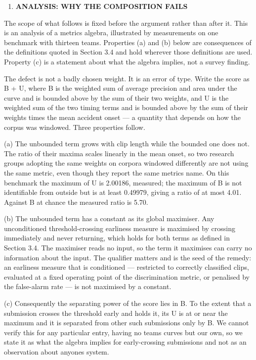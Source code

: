 \begin{enumerate}
\def\labelenumi{\arabic{enumi}.}
\setcounter{enumi}{4}
\item
  \textbf{ANALYSIS: WHY THE COMPOSITION FAILS}
\end{enumerate}

The scope of what follows is fixed before the argument rather than after it. This is an analysis of a metric\textquotesingle s algebra, illustrated by measurements on one benchmark with thirteen teams. Properties (a) and (b) below are consequences of the definitions quoted in Section 3.4 and hold wherever those definitions are used. Property (c) is a statement about what the algebra implies, not a survey finding.

The defect is not a badly chosen weight. It is an error of type. Write the score as B + U, where B is the weighted sum of average precision and area under the curve and is bounded above by the sum of their two weights, and U is the weighted sum of the two timing terms and is bounded above by the sum of their weights times the mean accident onset --- a quantity that depends on how the corpus was windowed. Three properties follow.

(a) The unbounded term grows with clip length while the bounded one does not. The ratio of their maxima scales linearly in the mean onset, so two research groups adopting the same weights on corpora windowed differently are not using the same metric, even though they report the same metric\textquotesingle s name. On this benchmark the maximum of U is 2.00186, measured; the maximum of B is not identifiable from outside but is at least 0.49979, giving a ratio of at most 4.01. Against B at chance the measured ratio is 5.70.

(b) The unbounded term has a constant as its global maximiser. Any unconditioned threshold-crossing earliness measure is maximised by crossing immediately and never returning, which holds for both terms as defined in Section 3.4. The maximiser reads no input, so the term it maximises can carry no information about the input. The qualifier matters and is the seed of the remedy: an earliness measure that is conditioned --- restricted to correctly classified clips, evaluated at a fixed operating point of the discrimination metric, or penalised by the false-alarm rate --- is not maximised by a constant.

(c) Consequently the separating power of the score lies in B. To the extent that a submission crosses the threshold early and holds it, its U is at or near the maximum and it is separated from other such submissions only by B. We cannot verify this for any particular entry, having no team\textquotesingle s curves but our own, so we state it as what the algebra implies for early-crossing submissions and not as an observation about anyone\textquotesingle s system.

